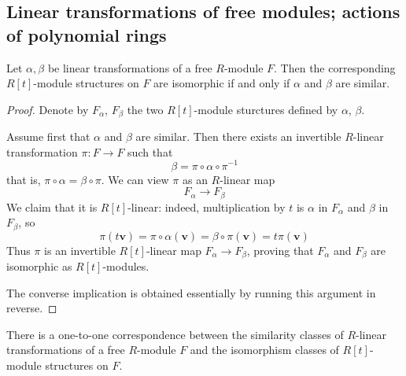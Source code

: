 \subsection{Linear transformations of free modules; actions of polynomial rings}
\begin{lemma}\label{linear similar iff module}
Let $\alpha,\beta$ be linear transformations of a free $R$-module $F$. Then the corresponding $R[t]$-module structures on $F$ are isomorphic if and only if $\alpha$ and $\beta$
are similar.
\end{lemma}
\begin{proof}
Denote by $F_\alpha$, $F_\beta$ the two $R[t]$-module sturctures defined by $\alpha$, $\beta$.\par
Assume first that $\alpha$ and $\beta$ are similar. Then there exists an invertible $R$-linear
transformation $\pi:F\to F$ such that
\[\beta=\pi\circ\alpha\circ\pi^{-1}\]
that is, $\pi\circ\alpha=\beta\circ\pi$. We can view $\pi$ as an $R$-linear map
\[F_\alpha\to F_\beta\]
We claim that it is $R[t]$-linear: indeed, multiplication by $t$ is $\alpha$ in $F_\alpha$ and $\beta$ in $F_\beta$, so
\[\pi(t\bm{v})=\pi\circ\alpha(\bm{v})=\beta\circ\pi(\bm{v})=t\pi(\bm{v})\]
Thus $\pi$ is an invertible $R[t]$-linear map $F_\alpha\to F_\beta$, proving that $F_\alpha$ and $F_\beta$ are isomorphic as $R[t]$-modules.\par
The converse implication is obtained essentially by running this argument in reverse.
\end{proof}
\begin{corollary}\label{Corr simi modu}
There is a one-to-one correspondence between the similarity classes of $R$-linear transformations of a free $R$-module $F$ and the isomorphism classes of $R[t]$-module structures on $F$.
\end{corollary}
